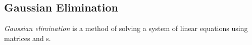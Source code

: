 \subsection{Gaussian Elimination}\label{subsec:Gaussian_Elimination}
\begin{definition}\label{def:Gaussian_Elimination}
  \emph{Gaussian elimination} is a method of solving a system of linear equations using matrices and s.
\end{definition}


